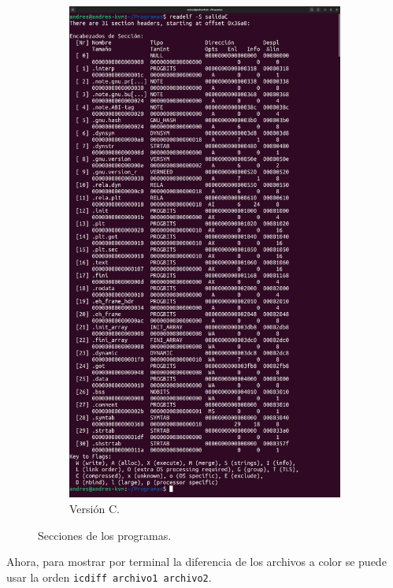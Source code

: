 \documentclass{article}
\begin{document}
\begin{figure}[H]
\begin{subfigure}{0.49\textwidth}
        \includegraphics[width=\textwidth]{imagenes/C/merged.png}
        \caption{Versión C.}
    \end{subfigure}

    \caption{Secciones de los programas.}
\end{figure}

\newpage

Ahora, para mostrar por terminal la diferencia de los archivos a color se puede usar la orden \verb|icdiff archivo1 archivo2|.
\end{document}
